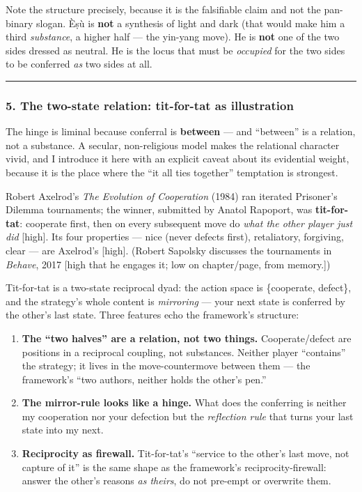 \documentclass[11pt]{article}
\begin{document}
Note the structure precisely, because it is the falsifiable claim and not the pan-binary slogan. Èṣù is \textbf{not} a synthesis of light and dark (that would make him a third \emph{substance}, a higher half — the yin-yang move). He is \textbf{not} one of the two sides dressed as neutral. He is the locus that must be \emph{occupied} for the two sides to be conferred \emph{as} two sides at all. 

\medskip\noindent\rule{\linewidth}{0.3pt}\medskip

\subsubsection*{5. The two-state relation: tit-for-tat as illustration}

The hinge is liminal because conferral is \textbf{between} — and ``between'' is a relation, not a substance. A secular, non-religious model makes the relational character vivid, and I introduce it here with an explicit caveat about its evidential weight, because it is the place where the ``it all ties together'' temptation is strongest.

Robert Axelrod's \emph{The Evolution of Cooperation} (1984) ran iterated Prisoner's Dilemma tournaments; the winner, submitted by Anatol Rapoport, was \textbf{tit-for-tat}: cooperate first, then on every subsequent move do \emph{what the other player just did} [high]. Its four properties — nice (never defects first), retaliatory, forgiving, clear — are Axelrod's [high]. (Robert Sapolsky discusses the tournaments in \emph{Behave}, 2017 [high that he engages it; low on chapter/\allowbreak{}page, from memory.])

Tit-for-tat is a two-state reciprocal dyad: the action space is \{cooperate, defect\}, and the strategy's whole content is \emph{mirroring} — your next state is conferred by the other's last state. Three features echo the framework's structure:

\begin{enumerate}
\item \textbf{The ``two halves'' are a relation, not two things.} Cooperate/\allowbreak{}defect are positions in a reciprocal coupling, not substances. Neither player ``contains'' the strategy; it lives in the move-countermove between them — the framework's ``two authors, neither holds the other's pen.''
\item \textbf{The mirror-rule looks like a hinge.} What does the conferring is neither my cooperation nor your defection but the \emph{reflection rule} that turns your last state into my next.
\item \textbf{Reciprocity as firewall.} Tit-for-tat's ``service to the other's last move, not capture of it'' is the same shape as the framework's reciprocity-firewall: answer the other's reasons \emph{as theirs}, do not pre-empt or overwrite them.
\end{enumerate}
\end{document}
